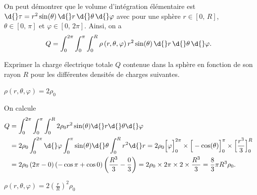 On peut démontrer que 
le volume d'intégration élémentaire est $\d{}\tau=r^2 \sin (\theta) \, \d{}r \, \d{} \theta \, \d{} \varphi$ avec pour une sphère $r \in \left[ 0,\, R\right]$, $\theta \in \left[ 0,\, \pi\right]$ et $\varphi \in \left[ 0,\, 2\pi\right]$. Ainsi, on a 
\[
Q = \int_{0}^{2\pi} \int_{0}^{\pi} \int_{0}^{R} \rho\left(r,\theta,\varphi\right) r^2 \sin (\theta) \, \d{}r \, \d{} \theta \, \d{} \varphi.
\]



Exprimer la charge électrique totale $Q$ contenue dans la sphère en fonction de son rayon $R$ pour les différentes densités de charges suivantes.


\debutEntrainement


\begin{enonce}
	$\rho(r,\theta,\varphi) = 2 \rho_0$ 
\end{enonce}


\begin{corrige}
On calcule
\begin{align*}
	Q &= \int_{0}^{2\pi} \int_{0}^{\pi} \int_{0}^{R} 2\rho_0  r^2 \sin (\theta) 
	 \d{}r \d{} \theta \d{} \varphi \\
	 &= 2\rho_0 \int_{0}^{2\pi} \d{} \varphi \int_{0}^{\pi} \sin (\theta) \d{} \theta \int_{0}^{R} r^2 \d{}r
	 = 2\rho_0 \Big[ \varphi \Big]^{2\pi}_{0} \times \Big[ -\cos (\theta) \Big]^{\pi}_{0} \times \Big[ \frac{r^3}{3} \Big]^{R}_{0} \\
	 &= 2\rho_0 \left( 2\pi - 0 \right) \left( -\cos \pi + \cos 0 \right) \left( \frac{R^3}{3} - \frac{0}{3} \right)
	 = 2\rho_0 \times 2 \pi \times 2 \times \frac{R^3}{3} = \frac{8}{3}\pi R^3 \rho_0.
\end{align*}
\end{corrige}





\begin{enonce}	
	$\rho(r,\theta,\varphi) = 2\left(\frac{r}{R}\right)^2 \rho_0$
\end{enonce}

